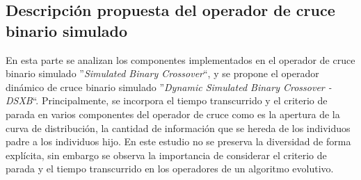 \subsection{Descripción propuesta del operador de cruce binario simulado}

En esta parte se analizan los componentes implementados en el operador de cruce binario simulado ''\textit{Simulated Binary Crossover}``, y se propone el operador dinámico de cruce binario simulado ''\textit{Dynamic Simulated Binary Crossover - DSXB}``.
%
Principalmente, se incorpora el tiempo transcurrido y el criterio de parada en varios componentes del operador de cruce como es la apertura de la curva de distribución, la cantidad de información que se hereda de los individuos padre a los individuos hijo.
%
En este estudio no se preserva la diversidad de forma explícita, sin embargo se observa la importancia de considerar el criterio de parada y el tiempo transcurrido en los operadores de un algoritmo evolutivo.